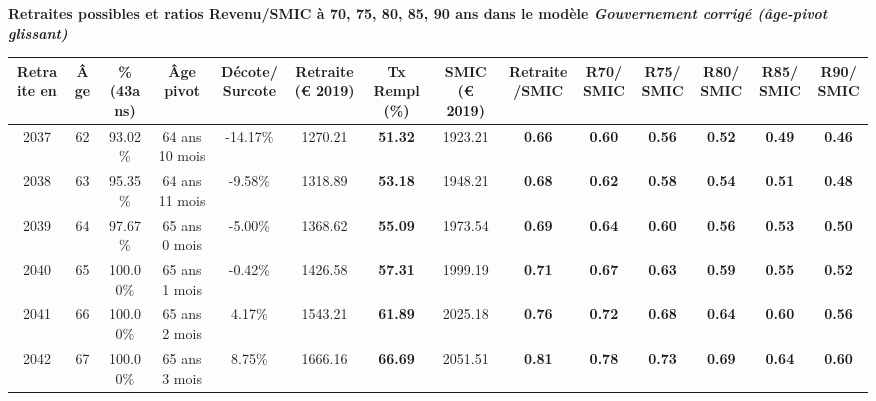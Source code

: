  \vspace{0.1cm} 
{\bf \noindent Retraites possibles et ratios Revenu/SMIC à 70, 75, 80, 85, 90 ans dans le modèle \emph{Gouvernement corrigé (âge-pivot glissant)}}  
 
\begin{adjustbox}{max width=\textwidth} 
\begin{tabular}[htb]{|c|c||c|c|c||c|c||c|c||c|c|c|c|c|} 
\hline 
 Retraite en &  Âge &  \%(43ans) &  Âge pivot &  Décote/Surcote &  Retraite (\euro{} 2019) &  Tx Rempl(\%) &  SMIC (\euro{} 2019) &  Retraite/SMIC &  R70/SMIC &  R75/SMIC &  R80/SMIC &  R85/SMIC &  R90/SMIC \\ 
\hline \hline 
 2037 &  62 &  93.02\% &  64 ans 10 mois &  -14.17\% &  1270.21 &  {\bf 51.32} &  1923.21 &  {\bf {\color{red} 0.66}} &  {\bf {\color{red} 0.60}} &  {\bf {\color{red} 0.56}} &  {\bf {\color{red} 0.52}} &  {\bf {\color{red} 0.49}} &  {\bf {\color{red} 0.46}} \\ 
\hline 
 2038 &  63 &  95.35\% &  64 ans 11 mois &  -9.58\% &  1318.89 &  {\bf 53.18} &  1948.21 &  {\bf {\color{red} 0.68}} &  {\bf {\color{red} 0.62}} &  {\bf {\color{red} 0.58}} &  {\bf {\color{red} 0.54}} &  {\bf {\color{red} 0.51}} &  {\bf {\color{red} 0.48}} \\ 
\hline 
 2039 &  64 &  97.67\% &  65 ans 0 mois &  -5.00\% &  1368.62 &  {\bf 55.09} &  1973.54 &  {\bf {\color{red} 0.69}} &  {\bf {\color{red} 0.64}} &  {\bf {\color{red} 0.60}} &  {\bf {\color{red} 0.56}} &  {\bf {\color{red} 0.53}} &  {\bf {\color{red} 0.50}} \\ 
\hline 
 2040 &  65 &  100.00\% &  65 ans 1 mois &  -0.42\% &  1426.58 &  {\bf 57.31} &  1999.19 &  {\bf {\color{red} 0.71}} &  {\bf {\color{red} 0.67}} &  {\bf {\color{red} 0.63}} &  {\bf {\color{red} 0.59}} &  {\bf {\color{red} 0.55}} &  {\bf {\color{red} 0.52}} \\ 
\hline 
 2041 &  66 &  100.00\% &  65 ans 2 mois &  4.17\% &  1543.21 &  {\bf 61.89} &  2025.18 &  {\bf {\color{red} 0.76}} &  {\bf {\color{red} 0.72}} &  {\bf {\color{red} 0.68}} &  {\bf {\color{red} 0.64}} &  {\bf {\color{red} 0.60}} &  {\bf {\color{red} 0.56}} \\ 
\hline 
 2042 &  67 &  100.00\% &  65 ans 3 mois &  8.75\% &  1666.16 &  {\bf 66.69} &  2051.51 &  {\bf {\color{red} 0.81}} &  {\bf {\color{red} 0.78}} &  {\bf {\color{red} 0.73}} &  {\bf {\color{red} 0.69}} &  {\bf {\color{red} 0.64}} &  {\bf {\color{red} 0.60}} \\ 
\hline 
\hline 
\end{tabular} 
\end{adjustbox} 
 
